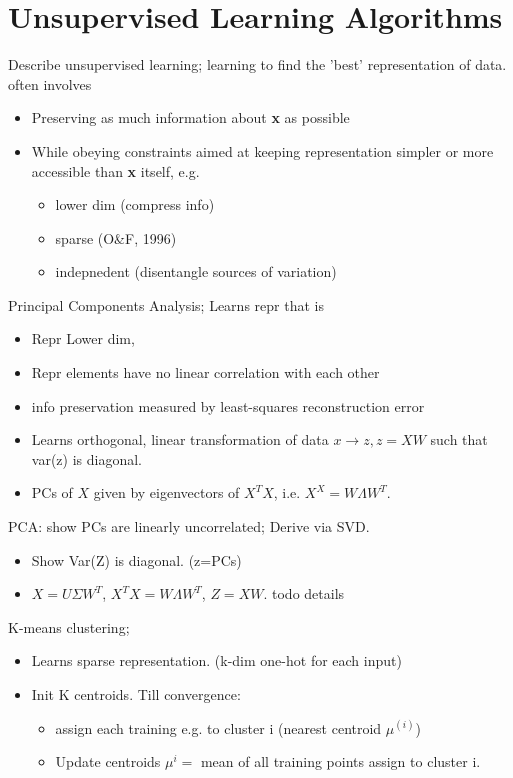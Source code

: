 \documentclass{article}
\begin{document}
\section{Unsupervised Learning Algorithms}

Describe unsupervised learning; learning to find the 'best' representation of data. often involves \begin{itemize}
	\item Preserving as much information about \textbf{x} as possible
	\item While obeying constraints aimed at keeping representation simpler or more accessible than \textbf{x} itself, e.g.
	\begin{itemize}
		\item lower dim (compress info)
		\item sparse (O\&F, 1996)
		\item indepnedent (disentangle sources of variation)
	\end{itemize}
\end{itemize}

Principal Components Analysis; Learns repr that is \begin{itemize}
	\item Repr Lower dim, 
	\item Repr elements have no linear correlation with each other
		\item info preservation measured by least-squares reconstruction error
	\item Learns orthogonal, linear transformation of data $x\to z, z=XW$ such that var(z) is diagonal.
	\item PCs of $X$ given by eigenvectors of $X^TX$, i.e. $X^X=W\Lambda W^T$.
\end{itemize}

PCA: show PCs are linearly uncorrelated; Derive via SVD. \begin{itemize}
	\item Show Var(Z) is diagonal. (z=PCs)
	\item $X = U\Sigma W^T$, $X^TX = W\Lambda W^T$, $Z=XW$. todo details
\end{itemize}

K-means clustering; \begin{itemize}
	\item Learns sparse representation. (k-dim one-hot for each input)
	\item Init K centroids. Till convergence:
	\begin{itemize}
		\item assign each training e.g. to cluster i (nearest centroid $\mu^{(i)}$)
		\item Update centroids $\mu^{i}=$ mean of all training points assign to cluster i.
	\end{itemize}
\end{itemize}
\end{document}
